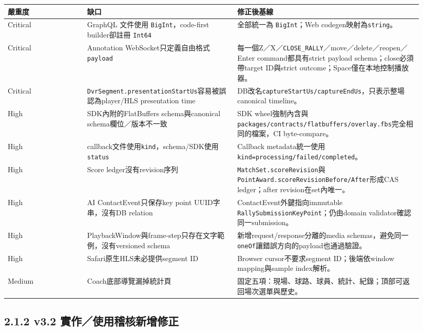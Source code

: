 \documentclass[
  9pt,
  a4paper,
]{article}
\begin{document}
\begin{longtable}[]{@{}>{\RaggedRight\arraybackslash}p{0.18\linewidth}>{\RaggedRight\arraybackslash}p{0.34\linewidth}>{\RaggedRight\arraybackslash}p{0.42\linewidth}@{}}
\toprule\noalign{}
嚴重度 & 缺口 & 修正後基線 \\
\midrule\noalign{}
\endhead
\bottomrule\noalign{}
\endlastfoot
Critical & GraphQL 文件使用 \texttt{BigInt}，code-first builder卻註冊
\texttt{Int64} & 全部統一為 \texttt{BigInt}；Web
codegen映射為\texttt{string}。 \\
Critical & Annotation WebSocket只定義自由格式 \texttt{payload} &
每一個Z／X／\texttt{CLOSE\_\allowbreak{}RALLY}／move／delete／reopen／Enter
command都具有strict payload schema；close必須帶target ID與strict outcome；Space僅在本地控制播放器。 \\
Critical & \texttt{DvrSegment.presentationStartUs}容易被誤認為player/HLS
presentation time &
DB改名\texttt{captureStartUs/captureEndUs}，只表示整場canonical
timeline。 \\
High & SDK內附的FlatBuffers schema與canonical schema欄位／版本不一致 &
SDK
wheel強制內含與\texttt{packages/contracts/flatbuffers/overlay.fbs}完全相同的檔案，CI
byte-compare。 \\
High & callback文件使用\texttt{kind}，schema/SDK使用\texttt{status} &
Callback metadata統一使用\texttt{kind=processing/failed/completed}。 \\
High & Score ledger沒有revision序列 &
\texttt{MatchSet.scoreRevision}與\texttt{PointAward.scoreRevisionBefore/After}形成CAS
ledger；after revision在set內唯一。 \\
High & AI ContactEvent只保存key point UUID字串，沒有DB relation &
ContactEvent外鍵指向immutable
\texttt{RallySubmissionKeyPoint}；仍由domain
validator確認同一submission。 \\
High & PlaybackWindow與frame-step只存在文字範例，沒有versioned schema &
新增request/response分離的media
schemas，避免同一\texttt{oneOf}讓錯誤方向的payload也通過驗證。 \\
High & Safari原生HLS未必提供segment ID & Browser cursor不要求segment
ID；後端依window mapping與sample index解析。 \\
Medium & Coach底部導覽漏掉統計頁 &
固定五項：現場、球路、球員、統計、紀錄；頂部可返回場次選單與歷史。 \\
\end{longtable}

\subsection{2.1.2 v3.2
實作／使用稽核新增修正}\label{212-v32-ux5be6ux4f5cux4f7fux7528ux7a3dux6838ux65b0ux589eux4feeux6b63}
\end{document}
